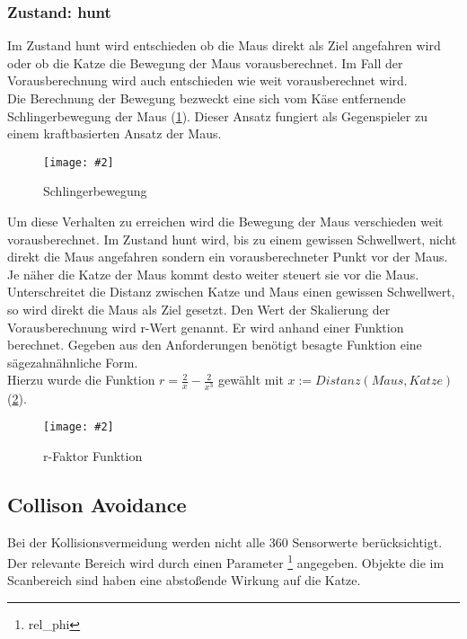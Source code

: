 \documentclass[
a4paper,     %
12pt         %
]{scrartcl}  %
\newcommand{\mygraphics}[3]{
\begin{figure}[!h]
  \begin{center}
    \texttt{[image: \#2]} \\
    \caption{#3}\label{fig:#2}
  \end{center}
\end{figure}

}
\begin{document}
\subsubsection{Zustand: \glqq hunt\grqq{}}
\label{hunt}
Im Zustand \glqq hunt\grqq{} wird entschieden ob die Maus direkt als Ziel angefahren wird oder ob die Katze die Bewegung der Maus vorausberechnet. Im Fall der Vorausberechnung wird auch entschieden wie weit vorausberechnet wird.\\
Die Berechnung der Bewegung bezweckt eine sich vom Käse entfernende Schlingerbewegung der Maus (\ref{fig:ziel.png}).
Dieser Ansatz fungiert als Gegenspieler zu einem kraftbasierten Ansatz der Maus.
\mygraphics{0.6\textwidth}{ziel.png}{Schlingerbewegung}
Um diese Verhalten zu erreichen wird die Bewegung der Maus verschieden weit vorausberechnet.
Im Zustand  hunt \grqq{} wird, bis zu einem gewissen Schwellwert, nicht direkt die Maus angefahren sondern ein vorausberechneter Punkt vor der Maus. Je näher die Katze der Maus kommt desto weiter steuert sie vor die Maus. Unterschreitet die Distanz zwischen Katze und Maus einen gewissen Schwellwert, so wird direkt die Maus als Ziel gesetzt.
\clearpage
Den Wert der Skalierung der Vorausberechnung wird r-Wert genannt. Er wird anhand einer Funktion berechnet.
Gegeben aus den Anforderungen benötigt besagte Funktion eine sägezahnähnliche Form.\\
Hierzu wurde die Funktion $r= \frac{2}{x} - \frac{2}{x^3}$
gewählt mit $x := Distanz(Maus,Katze)$  (\ref{fig:huntFunction.png}).
\mygraphics{0.9\textwidth}{huntFunction.png}{r-Faktor Funktion}
\clearpage
\subsection{Collison Avoidance}
Bei der Kollisionsvermeidung werden nicht alle 360 Sensorwerte berücksichtigt. Der relevante Bereich wird durch einen Parameter \footnote {rel\_phi} angegeben. Objekte die im Scanbereich sind haben eine abstoßende Wirkung auf die Katze.
\end{document}
